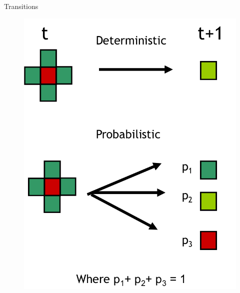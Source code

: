 \documentclass{eecslides}
\begin{document}
	\begin{frame}{Transitions}

		\begin{figure}[!t]
			\includegraphics[height=0.55\textheight]{transitions}
		\end{figure}

	\end{frame}

\end{document}
